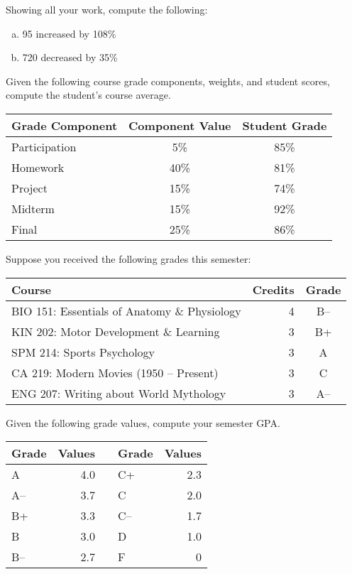 \documentclass[12pt,letterpaper]{exam}
\begin{document}
\begin{questions}
\newpage
\question[5] Showing all your work, compute the following:
	\begin{enumerate}[(a)]
	\item 95 increased by 108\%
	\item 720 decreased by 35\%
	\end{enumerate}



\newpage
\question[5] Given the following course grade components, weights, and student scores, compute the student's course average. 
	\begin{table}[H]
	\centering
	\begin{tabular}{lcc}
	Grade Component & Component Value & Student Grade \\ \hline
	Participation & 5\% & 85\% \\
	Homework & 40\% & 81\% \\
	Project & 15\% & 74\% \\
	Midterm & 15\% & 92\% \\
	Final & 25\% & 86\%
	\end{tabular}
	\end{table}



\newpage
\question[5] Suppose you received the following grades this semester: \par
	\begin{table}[h]
	\centering
	\begin{tabular}{lrc}
	Course & Credits & Grade \\ \hline
	BIO 151: Essentials of Anatomy \& Physiology & 4 & B-- \\
	KIN 202: Motor Development \& Learning & 3 & B+ \\
	SPM 214: Sports Psychology & 3 & A\phantom{-} \\
	CA 219: Modern Movies (1950 -- Present) & 3 & C\phantom{-} \\
	ENG 207: Writing about World Mythology & 3 & A--
	\end{tabular}
	\end{table} \par
Given the following grade values, compute your semester GPA. 
	\begin{table}[h]
	\centering
	\begin{tabular}{lrclr}
	Grade & Values & & Grade & Values \\ \hline
	A & 4.0 & \hspace{1cm} & C+ & 2.3 \\
	A-- & 3.7 & & C & 2.0 \\
	B+ & 3.3 & & C-- & 1.7 \\
	B & 3.0 & & D & 1.0 \\
	B-- & 2.7 & & F & 0
	\end{tabular}
	\end{table} 




\end{questions}
\end{document}
